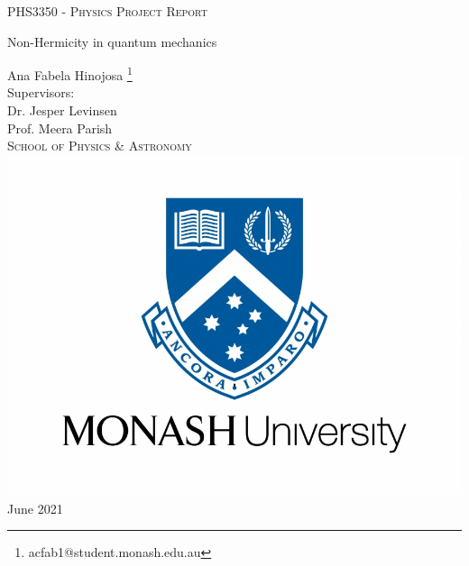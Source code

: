 \documentclass[10pt, a4paper, singlespacing]{report}
\begin{document}
\begin{titlepage}
\begin{center}


\vspace{0.5cm}
\textsc{PHS3350 - Physics Project Report} \\
\vspace{2.5cm}

{\Huge Non-Hermicity in quantum mechanics}
\vspace{3cm}

{\LARGE Ana Fabela Hinojosa \footnote{acfab1@student.monash.edu.au}} \\
\vspace{0.4cm}
{\Large Supervisors:\\ Dr. Jesper Levinsen \\ Prof. Meera Parish \\}
\textsc{School of Physics \& Astronomy} \\
\vspace{3cm}
\includegraphics[scale=0.2]{logo.jpg} \\ %
\vspace{3cm}
{\LARGE June 2021}\\
\vspace{0.5cm}
\end{center}
\end{titlepage}

\end{document}
